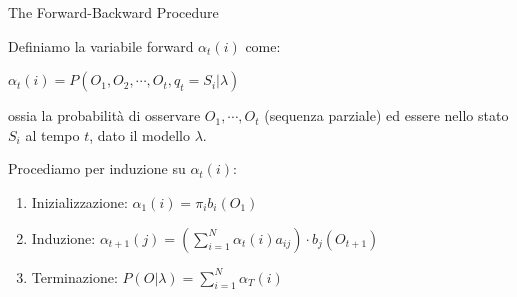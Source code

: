 \documentclass[hyperref={pdfpagelabels=false},slidestop,mathserif,red]{beamer}
\begin{document}
\begin{frame}{The Forward-Backward Procedure}
 \begin{block}{}
  Definiamo la variabile forward $\alpha_{t}(i)$ come:
	\begin{center}
	$\alpha_{t}(i) = P(O_{1}, O_{2}, \cdots, O_{t}, q_{t} = S_{i}|\lambda)$
	\end{center}
ossia la probabilit\`a di osservare $O_{1}, \cdots, O_{t}$ (sequenza parziale) ed essere nello stato $S_{i}$ al tempo $t$, dato il modello $\lambda$.
 \end{block}
 \begin{block}{}
	Procediamo per induzione su $\alpha_{t}(i)$:
	\begin{enumerate}
 	\item Inizializzazione: $\alpha_{1}(i) = \pi_{i}b_{i}(O_{1})$
	\item Induzione: $\alpha_{t+1}(j) = (\sum_{i = 1}^{N} \alpha_{t}(i)a_{ij}) \cdot b_{j}(O_{t+1})$
	\item Terminazione: $P(O|\lambda) = \sum_{i=1}^{N}\alpha_{T}(i)$
	\end{enumerate}
 \end{block}

\end{frame}
\end{document}
